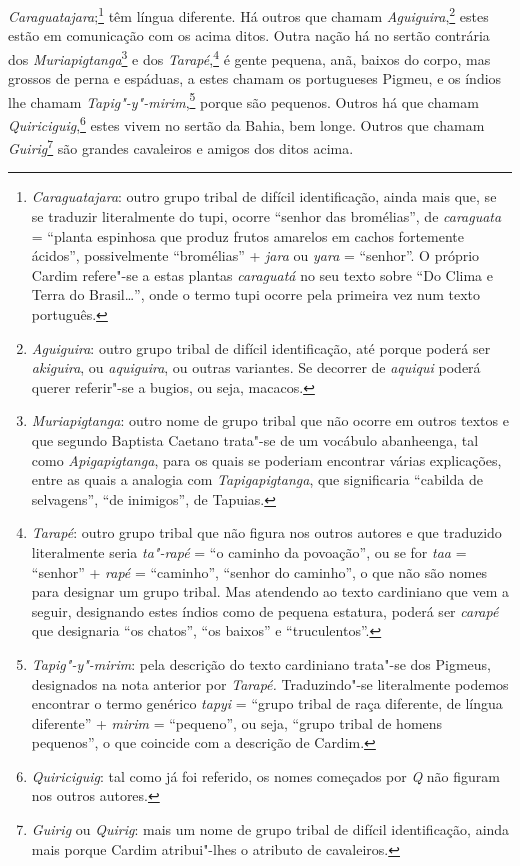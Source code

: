 \textit{Caraguatajara};\footnote{ \textit{Caraguatajara}: outro grupo
tribal de difícil identificação, ainda mais que, se se traduzir
literalmente do tupi, ocorre ``senhor das bromélias'', de
\textit{caraguata} = ``planta espinhosa que produz frutos amarelos em
cachos fortemente ácidos'', possivelmente ``bromélias'' + \textit{jara} ou
\textit{yara} = ``senhor''. O próprio Cardim refere"-se a estas plantas
\textit{caraguatá} no seu texto sobre ``Do Clima e Terra do
Brasil\ldots{}'', onde o termo tupi ocorre pela primeira vez num texto
português.} têm língua diferente. Há outros que chamam
\textit{Aguiguira},\footnote{ \textit{Aguiguira}: outro grupo tribal
de difícil identificação, até porque poderá ser \textit{akiguira}, ou
\textit{aquiguira}, ou outras variantes. Se decorrer de
\textit{aquiqui} poderá querer referir"-se a bugios, ou seja,
macacos.} estes estão em comunicação com os acima ditos. Outra
nação há no sertão contrária dos \textit{Muriapigtanga}\footnote{ \textit{Muriapigtanga}: 
outro nome de grupo tribal que não ocorre em
outros textos e que segundo Baptista Caetano trata"-se de um vocábulo
abanheenga, tal como \textit{Apigapigtanga}, para os quais se poderiam
encontrar várias explicações, entre as quais a analogia com
\textit{Tapigapigtanga}, que significaria ``cabilda de selvagens'', ``de
inimigos'', de Tapuias.} e dos 
\textit{Tarapé},\footnote{ \textit{Tarapé}: outro grupo tribal que não figura nos
outros autores e que traduzido literalmente seria \textit{ta"-rapé} = 
``o caminho da povoação'', ou se for \textit{taa} = ``senhor'' +
\textit{rapé} = ``caminho'', ``senhor do caminho'', o que não são nomes
para designar um grupo tribal. Mas atendendo ao texto cardiniano que
vem a seguir, designando estes índios como de pequena estatura, poderá
ser \textit{carapé} que designaria ``os chatos'', ``os baixos'' e
``truculentos''.} é gente pequena, anã, baixos do corpo, mas grossos de
perna e espáduas, a estes chamam os portugueses Pigmeu, e os índios lhe
chamam \textit{Tapig"-y"-mirim},\footnote{ \textit{Tapig"-y"-mirim}: pela
descrição do texto cardiniano trata"-se dos Pigmeus, designados na nota
anterior por \textit{Tarapé.} Traduzindo"-se literalmente podemos
encontrar o termo genérico \textit{tapyi} = ``grupo tribal de raça
diferente, de língua diferente'' + \textit{mirim} = ``pequeno'', ou seja,
``grupo tribal de homens pequenos'', o que coincide com a descrição de
Cardim.} porque são pequenos. Outros há que chamam
\textit{Quiriciguig},\footnote{ \textit{Quiriciguig}: tal como já foi
referido, os nomes começados por \textit{Q} não figuram nos outros
autores.} estes vivem no sertão da Bahia, bem longe. Outros
que chamam \textit{Guirig}\footnote{ \textit{Guirig} ou \textit{Quirig}:  
mais um nome de grupo tribal de difícil identificação, ainda mais
porque Cardim atribui"-lhes o atributo de cavaleiros.} são
grandes cavaleiros e amigos dos ditos acima.

